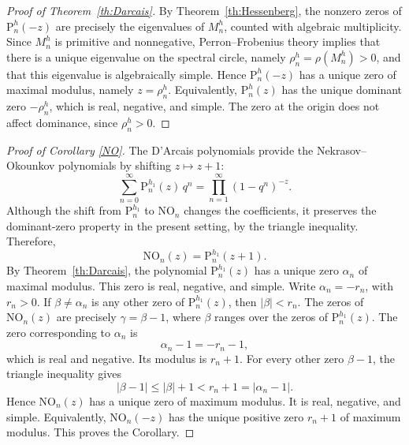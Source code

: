 \documentclass[11pt,reqno]{amsart}
\theoremstyle{plain}
\theoremstyle{remark}
\theoremstyle{definition}
\numberwithin{equation}{section}
\newcommand{\negmaxmod}{r}
\newcommand{\nop}{\mathrm{NO}}
\newcommand{\pol}{\mathrm{P}}
\begin{document}
\begin{proof}[Proof of Theorem~\ref{th:Darcais}]
By Theorem~\ref{th:Hessenberg}, the nonzero zeros of $\pol _n^h(-z)$ are precisely
the eigenvalues of $M_n^h$, counted with algebraic multiplicity. Since $M_n^h$
is primitive and nonnegative, Perron--Frobenius theory implies that there is a
unique eigenvalue on the spectral circle, namely $\rho_n^h=\rho(M_n^h)>0$, and
that this eigenvalue is algebraically simple. Hence $\pol _n^h(-z)$ has a unique
zero of maximal modulus, namely $z=\rho_n^h$. Equivalently, $\pol _n^h(z)$ has the
unique dominant zero $-\rho_n^h$, which is real, negative, and simple. The zero
at the origin does not affect dominance, since $\rho_n^h>0$.
\end{proof}















\begin{proof}[Proof of Corollary \ref{NO}]
The D'Arcais polynomials provide the Nekrasov--Okounkov polynomials \cite{HN19}
by shifting
$z \mapsto z+1$:
\begin{equation*}
\sum_{n=0}^{\infty}\pol _n^{h_1}(z) \,q^n =
\prod_{n=1}^{\infty}
\left(  1 - q^n \right)^{-z}.
\end{equation*}
Although the shift from \(\pol _n^{h_1}\) to \(\nop _n\) changes the coefficients, it preserves the dominant-zero property in the present setting, by the triangle inequality.
Therefore,
\[
\nop _n(z)=\pol ^{h_1}_n(z+1).
\]
By Theorem~\ref{th:Darcais}, the polynomial $\pol _n^{h_1}(z)$ has a unique
zero $\alpha_n$ of maximal modulus. This zero is real, negative, and simple.
Write $\alpha_n=-\negmaxmod
_{n}$, with $\negmaxmod
_{n}>0$. If $\beta\neq \alpha_n$ is any other zero of $\pol ^{h_1}_n(z)$, then $
\left| \beta \right| <\negmaxmod _{n}$.
The zeros of $\nop _n(z)$ are precisely $\gamma=\beta-1$, where $\beta$ ranges over the zeros of $\pol ^{h_1}_n(z)$. The zero corresponding to $\alpha_n$ is
\[
\alpha_n-1=-\negmaxmod
_n-1,
\]
which is real and negative. Its modulus is $\negmaxmod
_n+1$. For every other zero $\beta-1$, the triangle inequality gives
\[
|\beta-1|\leq |\beta|+1<\negmaxmod
_{n}+1=|\alpha_n-1|.
\]
Hence $\nop _n(z)$ has a unique zero of maximum
modulus. It is real, negative, and simple. Equivalently, $\nop _n(-z)$ has the unique positive zero $
\negmaxmod _{n}+1$ of maximum
modulus. This proves the Corollary.
\end{proof}
\end{document}
